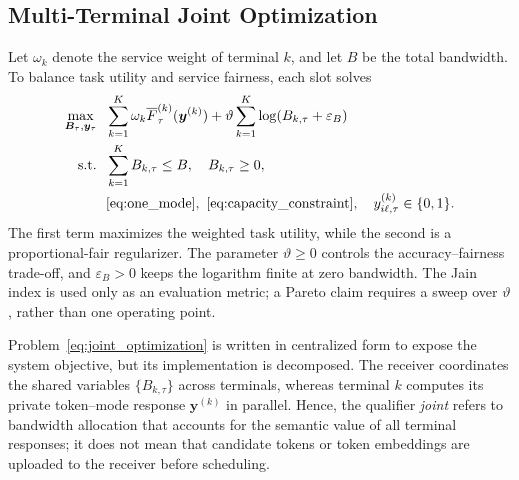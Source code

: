 \documentclass[journal]{IEEEtran}
\begin{document}
\subsection{Multi-Terminal Joint Optimization}

Let $\omega_k$ denote the service weight of terminal $k$, and let $B$ be the total bandwidth. To balance task utility and service fairness, each slot solves
\begin{align}
\max_{\bm B_{\tau},\bm y_{\tau}}~~
&\sum_{k=1}^{K}\omega_k\overline F_{\tau}^{(k)}(\bm y^{(k)})
+\vartheta\sum_{k=1}^{K}\log(B_{k,\tau}+\varepsilon_B)
\label{eq:joint_optimization}\\
\mathrm{s.t.}~~
&\sum_{k=1}^{K}B_{k,\tau}\leq B,\quad B_{k,\tau}\geq0,
\label{eq:bandwidth_constraint}\\
&\eqref{eq:one_mode},~\eqref{eq:capacity_constraint},
\quad y_{i\ell,\tau}^{(k)}\in\{0,1\}.
\notag
\end{align}
The first term maximizes the weighted task utility, while the second is a proportional-fair regularizer. The parameter $\vartheta\geq0$ controls the accuracy--fairness trade-off, and $\varepsilon_B>0$ keeps the logarithm finite at zero bandwidth. The Jain index is used only as an evaluation metric; a Pareto claim requires a sweep over $\vartheta$, rather than one operating point.

Problem~\eqref{eq:joint_optimization} is written in centralized form to expose the system objective, but its implementation is decomposed. The receiver coordinates the shared variables $\{B_{k,\tau}\}$ across terminals, whereas terminal $k$ computes its private token--mode response $\bm y^{(k)}$ in parallel. Hence, the qualifier \emph{joint} refers to bandwidth allocation that accounts for the semantic value of all terminal responses; it does not mean that candidate tokens or token embeddings are uploaded to the receiver before scheduling.
\end{document}
